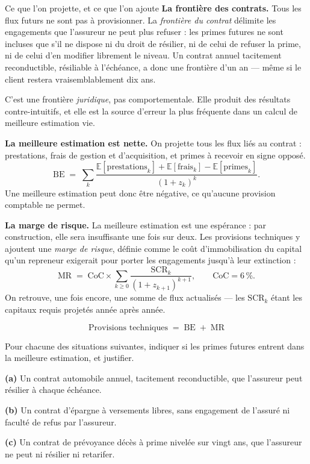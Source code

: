 \begin{generalisation}{Ce que l'on projette, et ce que l'on ajoute}
\textbf{La frontière des contrats.} Tous les flux futurs ne sont pas à
provisionner. La \emph{frontière du contrat}
délimite les engagements que l'assureur ne peut plus refuser : les primes
futures ne sont incluses que s'il ne dispose ni du droit de résilier, ni de
celui de refuser la prime, ni de celui d'en modifier librement le niveau. Un
contrat annuel tacitement reconductible, résiliable à l'échéance, a donc une
frontière d'un an --- même si le client restera vraisemblablement dix ans.

C'est une frontière \emph{juridique}, pas comportementale. Elle produit des
résultats contre-intuitifs, et elle est la source d'erreur la plus fréquente
dans un calcul de meilleure estimation vie.

\medskip
\textbf{La meilleure estimation est nette.} On projette tous les flux liés au
contrat : prestations, frais de gestion et d'acquisition, et primes à recevoir
en signe opposé.
\[
  \mathrm{BE} \;=\; \sum_{k} \frac{\mathbb{E}[\text{prestations}_k] + \mathbb{E}[\text{frais}_k]
    - \mathbb{E}[\text{primes}_k]}{(1+z_k)^{k}} .
\]
Une meilleure estimation peut donc être négative, ce qu'aucune provision
comptable ne permet.

\medskip
\textbf{La marge de risque.} La meilleure estimation est une espérance : par
construction, elle sera insuffisante une fois sur deux. Les provisions
techniques y ajoutent une \emph{marge de risque},
définie comme le coût d'immobilisation du capital qu'un repreneur exigerait
pour porter les engagements jusqu'à leur extinction :
\[
  \mathrm{MR} \;=\; \mathrm{CoC} \times \sum_{k \geq 0}
    \frac{\mathrm{SCR}_k}{(1+z_{k+1})^{k+1}},
  \qquad \mathrm{CoC} = 6\,\% .
\]
On retrouve, une fois encore, une somme de flux actualisés --- les $\mathrm{SCR}_k$
étant les capitaux requis projetés année après année.

\medskip
\[
  \boxed{\ \text{Provisions techniques} \;=\; \mathrm{BE} \;+\; \mathrm{MR}\ }
\]
\end{generalisation}

\begin{exercice}
Pour chacune des situations suivantes, indiquer si les primes futures entrent
dans la meilleure estimation, et justifier.

\textbf{(a)} Un contrat automobile annuel, tacitement reconductible, que
l'assureur peut résilier à chaque échéance.

\textbf{(b)} Un contrat d'épargne à versements libres, sans engagement de
l'assuré ni faculté de refus par l'assureur.

\textbf{(c)} Un contrat de prévoyance décès à prime nivelée sur vingt ans, que
l'assureur ne peut ni résilier ni retarifer.
\end{exercice}

